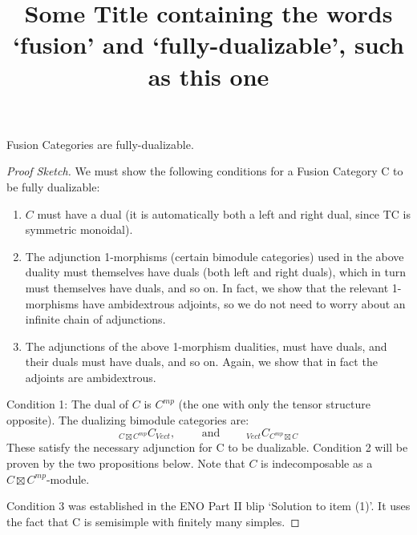 \documentclass{amsart}
\title{Some Title containing the words `fusion' and `fully-dualizable', such as this one}
\begin{document}
	
\maketitle	
	

\begin{theorem}
	Fusion Categories are fully-dualizable. 
\end{theorem}
	
\begin{proof}[Proof Sketch]
We must show the following conditions for a Fusion Category C to be fully dualizable: 
	\begin{enumerate}
		\item $C$ must have a dual (it is automatically both a left and right dual, since TC is symmetric monoidal).
		\item The adjunction 1-morphisms (certain bimodule categories) used in the above duality must themselves have duals (both left and right duals), which in turn must themselves have duals, and so on.  In fact, we show that the relevant 1-morphisms have ambidextrous adjoints, so we do not need to worry about an infinite chain of adjunctions.
		\item The adjunctions of the above 1-morphism dualities, must have duals, and their duals must have duals, and so on.  Again, we show that in fact the adjoints are ambidextrous.
	\end{enumerate}

Condition 1: The dual of $C$ is $C^{mp}$ (the one with only the tensor structure opposite). The dualizing bimodule categories are:
\begin{equation*}
	{}_{C \boxtimes C^{mp}} C_{Vect}, \qquad \text{ and } \qquad {}_{Vect} C_{C^{mp} \boxtimes C}	
\end{equation*} 
These satisfy the necessary adjunction for C to be dualizable. 
Condition 2 will be proven by the two propositions below. Note that $C$ is indecomposable as a $C \boxtimes C^{mp}$-module.  
	
Condition 3 was established in the ENO Part II blip `Solution to item (1)'.  It uses the fact that C is semisimple with finitely many simples. 	
	
\end{proof}	
	
\end{document}
